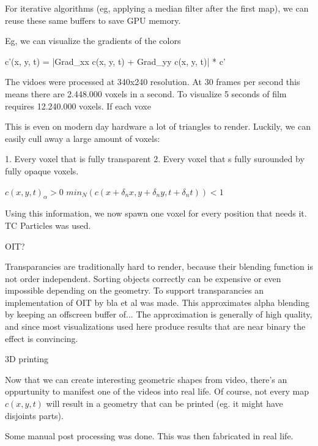 For iterative algorithms (eg, applying a median filter after the first map), we can reuse these same buffers to save GPU memory.



Eg, we can visualize the gradients of the colors

c'(x, y, t) = |Grad_xx c(x, y, t) + Grad_yy c(x, y, t)| * c'



The vidoes were processed at 340x240 resolution. At 30 frames per second this means there are 2.448.000 voxels in a second. To visualize 5 seconds of film requires 12.240.000 voxels. If each voxe

This is even on modern day hardware a lot of triangles to render. Luckily, we can easily cull away a large amount of voxels:

1. Every voxel that is fully transparent
2. Every voxel that s fully surounded by fully opaque voxels.

$c(x, y, t)_{\alpha} > 0$
$min_{N}(c(x + \delta_n x, y + \delta_n y, t + \delta_n t)) < 1$


Using this information, we now spawn one voxel for every position that needs it. TC Particles was used.




OIT?

Transparancies are traditionally hard to render, because their blending function is not order independent. Sorting objects correctly can be expensive or even impossible depending on the geometry. To support transparancies an implementation of OIT by bla et al was made. This approximates alpha blending by keeping an offscreen buffer of... The approximation is generally of high quality, and since most visualizations used here produce results that are near binary the effect is convincing.




3D printing

Now that we can create interesting geometric shapes from video, there's an oppurtunity to manifest one of the videos into real life. Of course, not every map $c(x, y, t)$ will result in a geometry that can be printed (eg. it might have disjoints parts).

Some manual post processing was done. This was then fabricated in real life.